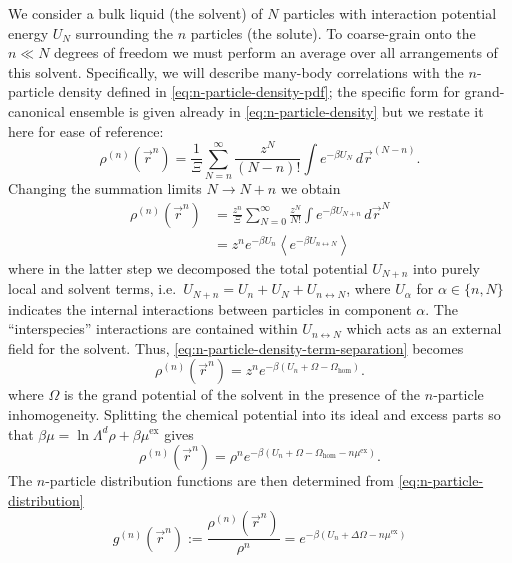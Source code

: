 \documentclass[11pt,twoside]{report}
\begin{document}
We consider a bulk liquid (the solvent) of $N$ particles with interaction potential energy $U_N$ surrounding the $n$ particles (the solute).
To coarse-grain onto the $n \ll N$ degrees of freedom we must perform an average over all arrangements of this solvent.
Specifically, we will describe many-body correlations with the $n$-particle density defined in \eqref{eq:n-particle-density-pdf}; the specific form for grand-canonical ensemble is given already in \eqref{eq:n-particle-density} but we restate it here for ease of reference:
\begin{equation*}
  \rho^{(n)}(\vec{r}^n)
  =
  \frac{1}{\Xi} \sum_{N=n}^\infty \frac{z^N}{(N-n)!} \int e^{-\beta U_N} \, d\vec{r}^{(N-n)}.
\end{equation*}
Changing the summation limits $N \rightarrow N+n$ we obtain
\begin{equation}\label{eq:n-particle-density-term-separation}
\begin{aligned}
  \rho^{(n)}(\vec{r}^n)
  &=
  \frac{z^n}{\Xi} \sum_{N=0}^\infty \frac{z^N}{N!} \int e^{-\beta U_{N+n}} \, d\vec{r}^{N}
  \\ &=
  z^n e^{-\beta U_n} \left< e^{-\beta U_{n \leftrightarrow N}} \right>
\end{aligned}
\end{equation}
where in the latter step we decomposed the total potential $U_{N+n}$ into purely local and solvent terms, i.e.\ $U_{N+n} = U_n + U_N + U_{n \leftrightarrow N}$, where $U_\alpha$ for $\alpha \in \{n,N\}$ indicates the internal interactions between particles in component $\alpha$.
The ``interspecies'' interactions are contained within $U_{n \leftrightarrow N}$ which acts as an external field for the solvent.
Thus, \eqref{eq:n-particle-density-term-separation} becomes
\begin{equation*}
  \rho^{(n)}(\vec{r}^n)
  =
  z^n e^{-\beta (U_n + \Omega - \Omega_\mathrm{hom})}.
\end{equation*}
where $\Omega$ is the grand potential of the solvent in the presence of the $n$-particle inhomogeneity.
Splitting the chemical potential into its ideal and excess parts so that $\beta\mu = \ln{\Lambda^d \rho} + \beta\mu^\mathrm{ex}$ gives
\begin{equation*}
  \rho^{(n)}(\vec{r}^n)
  =
  \rho^n e^{-\beta (U_n + \Omega - \Omega_\mathrm{hom} - n\mu^\mathrm{ex})}.
\end{equation*}
The $n$-particle distribution functions are then determined from \eqref{eq:n-particle-distribution}
\begin{equation}\label{eq:distribution-solvation}
  g^{(n)}(\vec{r}^n)
  := \frac{\rho^{(n)}(\vec{r}^n)}{\rho^n}
  = e^{-\beta(U_n + \Delta\Omega - n\mu^\mathrm{ex})}
\end{equation}
\end{document}
